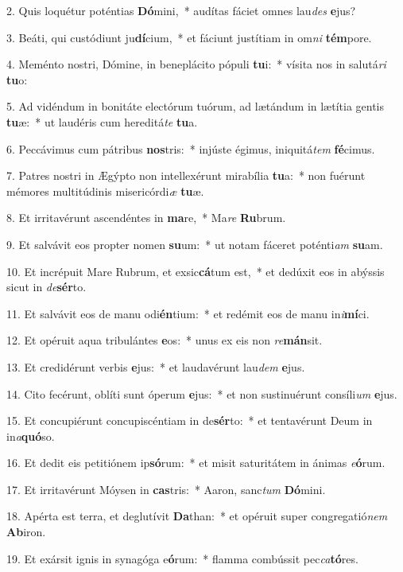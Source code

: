 2. Quis loquétur poténtias \textbf{Dó}mini,~*  audítas fáciet omnes lau\textit{des} \textbf{e}jus?\

3. Beáti, qui custódiunt ju\textbf{dí}cium,~*  et fáciunt justítiam in om\textit{ni} \textbf{tém}pore.\

4. Meménto nostri, Dómine, in beneplácito pópuli \textbf{tu}i:~*  vísita nos in salutá\textit{ri} \textbf{tu}o:\

5. Ad vidéndum in bonitáte electórum tuórum, ad lætándum in lætítia gentis \textbf{tu}æ:~*  ut laudéris cum hereditá\textit{te} \textbf{tu}a.\

6. Peccávimus cum pátribus \textbf{nos}tris:~*  injúste égimus, iniquitá\textit{tem} \textbf{fé}cimus.\

7. Patres nostri in Ægýpto non intellexérunt mirabília \textbf{tu}a:~*  non fuérunt mémores multitúdinis misericórdi\textit{æ} \textbf{tu}æ.\

8. Et irritavérunt ascendéntes in \textbf{ma}re,~*  Ma\textit{re} \textbf{Ru}brum.\

9. Et salvávit eos propter nomen \textbf{su}um:~*  ut notam fáceret poténti\textit{am} \textbf{su}am.\

10. Et incrépuit Mare Rubrum, et exsic\textbf{cá}tum est,~*  et dedúxit eos in abýssis sicut in \textit{de}\textbf{sér}to.\

11. Et salvávit eos de manu odi\textbf{én}tium:~*  et redémit eos de manu in\textit{i}\textbf{mí}ci.\

12. Et opéruit aqua tribulántes \textbf{e}os:~*  unus ex eis non \textit{re}\textbf{mán}sit.\

13. Et credidérunt verbis \textbf{e}jus:~*  et laudavérunt lau\textit{dem} \textbf{e}jus.\

14. Cito fecérunt, oblíti sunt óperum \textbf{e}jus:~*  et non sustinuérunt consíli\textit{um} \textbf{e}jus.\

15. Et concupiérunt concupiscéntiam in de\textbf{sér}to:~*  et tentavérunt Deum in in\textit{a}\textbf{quó}so.\

16. Et dedit eis petitiónem ip\textbf{só}rum:~*  et misit saturitátem in ánimas \textit{e}\textbf{ó}rum.\

17. Et irritavérunt Móysen in \textbf{cas}tris:~*  Aaron, sanc\textit{tum} \textbf{Dó}mini.\

18. Apérta est terra, et deglutívit \textbf{Da}than:~*  et opéruit super congregatió\textit{nem} \textbf{Ab}iron.\

19. Et exársit ignis in synagóga e\textbf{ó}rum:~*  flamma combússit pec\textit{ca}\textbf{tó}res.\

